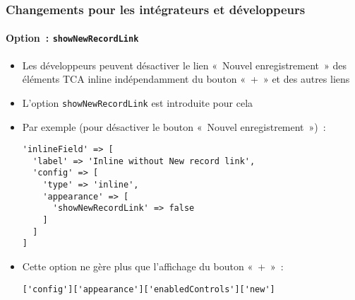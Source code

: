 %

\begin{frame}[fragile]
	\frametitle{Changements pour les intégrateurs et développeurs}
	\framesubtitle{Option~: \texttt{showNewRecordLink}}


	\begin{itemize}
		\item Les développeurs peuvent désactiver le lien «~Nouvel enregistrement~» des éléments TCA inline
			indépendamment du bouton «~+~» et des autres liens
		\item L'option \texttt{showNewRecordLink} est introduite pour cela
		\item Par exemple (pour désactiver le bouton «~Nouvel enregistrement~»)~:
\begin{lstlisting}
'inlineField' => [
  'label' => 'Inline without New record link',
  'config' => [
    'type' => 'inline',
    'appearance' => [
      'showNewRecordLink' => false
    ]
  ]
]
\end{lstlisting}

		\item Cette option ne gère plus que l'affichage du bouton «~+~»~:
\begin{lstlisting}
['config']['appearance']['enabledControls']['new']
\end{lstlisting}

	\end{itemize}

\end{frame}

